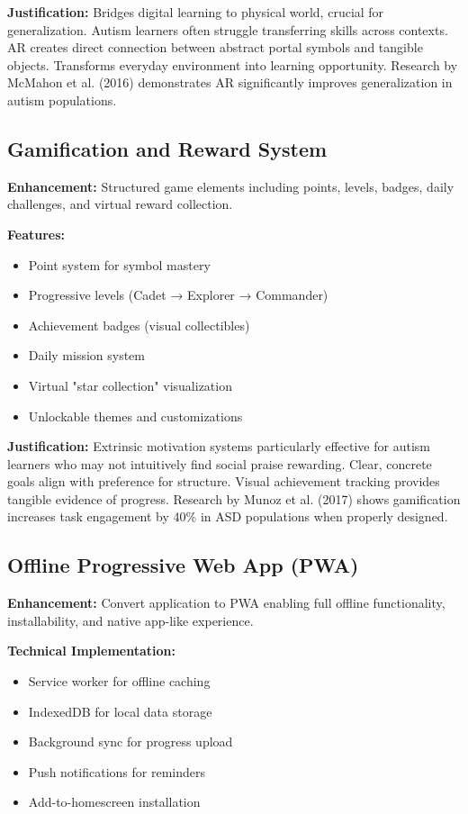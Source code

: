 \documentclass[11pt, a4paper]{article}
\begin{document}
\textbf{Justification:} Bridges digital learning to physical world, crucial for generalization. Autism learners often struggle transferring skills across contexts. AR creates direct connection between abstract portal symbols and tangible objects. Transforms everyday environment into learning opportunity. Research by McMahon et al. (2016) demonstrates AR significantly improves generalization in autism populations.

\subsection{Gamification and Reward System}

\textbf{Enhancement:} Structured game elements including points, levels, badges, daily challenges, and virtual reward collection.

\textbf{Features:}
\begin{itemize}[leftmargin=*, noitemsep]
    \item Point system for symbol mastery
    \item Progressive levels (Cadet → Explorer → Commander)
    \item Achievement badges (visual collectibles)
    \item Daily mission system
    \item Virtual "star collection" visualization
    \item Unlockable themes and customizations
\end{itemize}

\textbf{Justification:} Extrinsic motivation systems particularly effective for autism learners who may not intuitively find social praise rewarding. Clear, concrete goals align with preference for structure. Visual achievement tracking provides tangible evidence of progress. Research by Munoz et al. (2017) shows gamification increases task engagement by 40\% in ASD populations when properly designed.

\subsection{Offline Progressive Web App (PWA)}

\textbf{Enhancement:} Convert application to PWA enabling full offline functionality, installability, and native app-like experience.

\textbf{Technical Implementation:}
\begin{itemize}[leftmargin=*, noitemsep]
    \item Service worker for offline caching
    \item IndexedDB for local data storage
    \item Background sync for progress upload
    \item Push notifications for reminders
    \item Add-to-homescreen installation
\end{itemize}
\end{document}
